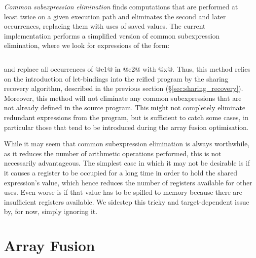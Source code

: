 \emph{Common subexpression elimination} finds computations that are performed at
least twice on a given execution path and eliminates the second and later
occurrences, replacing them with uses of saved values. The current
implementation performs a simplified version of common subexpression
elimination, where we look for expressions of the form:
%
\begin{lstlisting}[style=Haskell,numbers=none]
%\bf$\langle$ common subexpression elimination $\rangle$% let x = e1 in [x/e1]e2
\end{lstlisting}
%
and replace all occurrences of @e1@ in @e2@ with @x@. Thus, this method relies on the
introduction of let-bindings into the reified program by the sharing recovery algorithm, described
in the previous section (\S\ref{sec:sharing_recovery}). Moreover, this method will not eliminate any
common subexpressions that are not already defined in the source program. This might not completely
eliminate redundant expressions from the program, but is sufficient to catch some cases, in
particular those that tend to be introduced during the array fusion optimisation.

While it may seem that common subexpression elimination is always worthwhile, as
it reduces the number of arithmetic operations performed, this is not
necessarily advantageous. The simplest case in which it may not be desirable is
if it causes a register to be occupied for a long time in order to hold the
shared expression's value, which hence reduces the number of registers available
for other uses. Even worse is if that value has to be spilled to memory because
there are insufficient registers available. We sidestep this tricky and
target-dependent issue by, for now, simply ignoring it.


\section{Array Fusion}
\label{sec:fusion}

